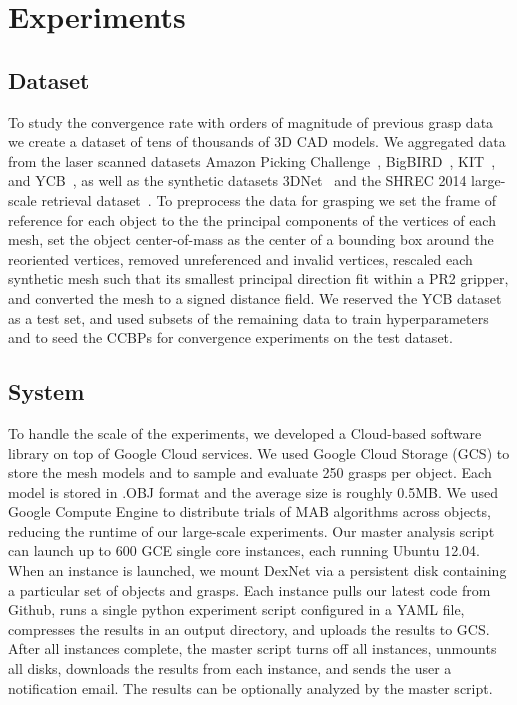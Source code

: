 \section{Experiments}

\subsection{Dataset}
To study the convergence rate with orders of magnitude of previous grasp data we create a dataset of tens of thousands of 3D CAD models.
We aggregated data from the laser scanned datasets Amazon Picking Challenge~\cite{}, BigBIRD~\cite{}, KIT~\cite{}, and YCB~\cite{}, as well as the synthetic datasets 3DNet~\cite{wohlkinger20123dnet} and the SHREC 2014 large-scale retrieval dataset~\cite{}.
To preprocess the data for grasping we set the frame of reference for each object to the the principal components of the vertices of each mesh, set the object center-of-mass as the center of a bounding box around the reoriented vertices, removed unreferenced and invalid vertices, rescaled each synthetic mesh such that its smallest principal direction fit within a PR2 gripper, and converted the mesh to a signed distance field.
We reserved the YCB dataset as a test set, and used subsets of the remaining data to train hyperparameters and to seed the CCBPs for convergence experiments on the test dataset.

\subsection{System}
To handle the scale of the experiments, we developed a Cloud-based software library on top of Google Cloud services.
We used Google Cloud Storage (GCS) to store the mesh models and to sample and evaluate 250 grasps per object.
Each model is stored in .OBJ format and the average size is roughly 0.5MB.
We used Google Compute Engine to distribute trials of MAB algorithms across objects, reducing the runtime of our large-scale experiments.
Our master analysis script can launch up to 600 GCE single core instances, each running Ubuntu 12.04.
When an instance is launched, we mount DexNet via a persistent disk containing a particular set of objects and grasps.
Each instance pulls our latest code from Github, runs a single python experiment script configured in a YAML file, compresses the results in an output directory, and uploads the results to GCS.
After all instances complete, the master script turns off all instances, unmounts all disks, downloads the results from each instance, and sends the user a notification email.
The results can be optionally analyzed by the master script.

